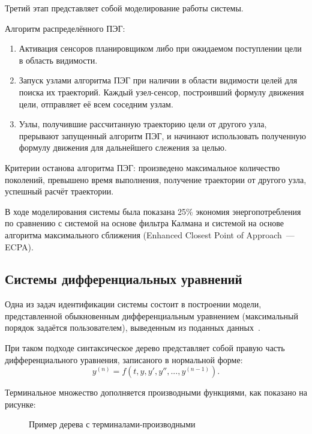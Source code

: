 Третий этап представляет собой моделирование работы системы.

Алгоритм распределённого ПЭГ:
\begin{enumerate}
  \item Активация сенсоров планировщиком либо при ожидаемом поступлении цели в область видимости.
  \item Запуск узлами алгоритма ПЭГ при наличии в области видимости целей для поиска их траекторий. Каждый узел-сенсор, построивший формулу движения цели, отправляет её всем соседним узлам.
  \item Узлы, получившие рассчитанную траекторию цели от другого узла, прерывают запущенный алгоритм ПЭГ, и начинают использовать полученную формулу движения для дальнейшего слежения за целью.
\end{enumerate}

Критерии останова алгоритма ПЭГ: произведено максимальное количество поколений, превышено время выполнения, получение траектории от другого узла, успешный расчёт траектории.

В ходе моделирования системы была показана 25\% экономия энергопотребления по сравнению с системой на основе фильтра Калмана и системой на основе алгоритма максимального сближения (Enhanced Closest Point of Approach~--- ECPA).


\subsection{Системы дифференциальных уравнений}

Одна из задач идентификации системы состоит в построении модели, представленной обыкновенным дифференциальным уравнением (максимальный порядок задаётся пользователем), выведенным из поданных данных~\cite{conf/iscis/FloresG05}.

При таком подходе синтаксическое дерево представляет собой правую часть дифференциального уравнения, записаного в нормальной форме:
$$
y^{(n)} = f(t, y, y', y'', ..., y^{(n-1)}).
$$

Терминальное множество дополняется производными функциями, как показано на рисунке:

\begin{figure} [h]
  \center
  \caption{Пример дерева с терминалами-производными}
  \label{img:example_tree_with_differentials}
\end{figure}

